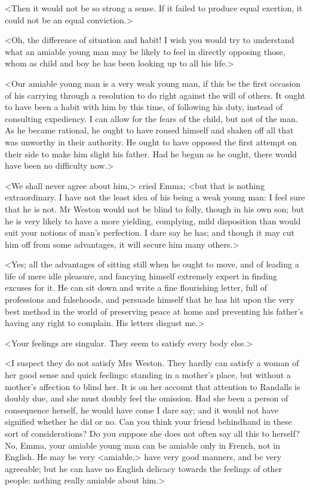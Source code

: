 <Then it would not be so strong a sense. If it failed to produce equal exertion, it could not be an equal conviction.>

<Oh, the difference of situation and habit! I wish you would try to understand what an amiable young man may be likely to feel in directly opposing those, whom as child and boy he has been looking up to all his life.>

<Our amiable young man is a very weak young man, if this be the first occasion of his carrying through a resolution to do right against the will of others. It ought to have been a habit with him by this time, of following his duty, instead of consulting expediency. I can allow for the fears of the child, but not of the man. As he became rational, he ought to have roused himself and shaken off all that was unworthy in their authority. He ought to have opposed the first attempt on their side to make him slight his father. Had he begun as he ought, there would have been no difficulty now.>

<We shall never agree about him,> cried Emma; <but that is nothing extraordinary. I have not the least idea of his being a weak young man: I feel sure that he is not. Mr Weston would not be blind to folly, though in his own son; but he is very likely to have a more yielding, complying, mild disposition than would suit your notions of man's perfection. I dare say he has; and though it may cut him off from some advantages, it will secure him many others.>

<Yes; all the advantages of sitting still when he ought to move, and of leading a life of mere idle pleasure, and fancying himself extremely expert in finding excuses for it. He can sit down and write a fine flourishing letter, full of professions and falsehoods, and persuade himself that he has hit upon the very best method in the world of preserving peace at home and preventing his father's having any right to complain. His letters disgust me.>

<Your feelings are singular. They seem to satisfy every body else.>

<I suspect they do not satisfy Mrs Weston. They hardly can satisfy a woman of her good sense and quick feelings: standing in a mother's place, but without a mother's affection to blind her. It is on her account that attention to Randalls is doubly due, and she must doubly feel the omission. Had she been a person of consequence herself, he would have come I dare say; and it would not have signified whether he did or no. Can you think your friend behindhand in these sort of considerations? Do you suppose she does not often say all this to herself? No, Emma, your amiable young man can be amiable only in French, not in English. He may be very <amiable,> have very good manners, and be very agreeable; but he can have no English delicacy towards the feelings of other people: nothing really amiable about him.>

